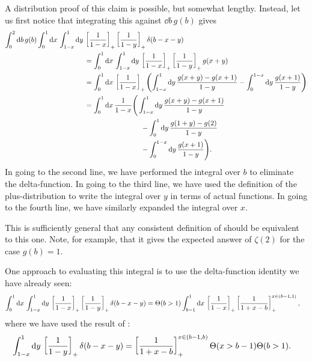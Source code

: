 A distribution proof of this claim is possible, but somewhat lengthy.
%
Instead, let us first notice that integrating this against \(\dd b\,g(b)\) gives
\begin{align}
    \int_0^2 \dd b\,g(b)
    \int_{0}^{1} \dd x\,
    \int_{1-x}^{1} \dd y\,
    &
    \le[\frac{1}{1-x}\ri]_+
    \le[\frac{1}{1-y}\ri]_+
    \delta(b - x - y)
    \notag
    \\
    &=
    \notag
    \int_{0}^{1} \dd x\,
    \int_{1-x}^{1} \dd y\,
    \le[\frac{1}{1-x}\ri]_+
    \le[\frac{1}{1-y}\ri]_+
    g(x + y)
    \\
    &=
    \notag
    \int_{0}^{1} \dd x\,
    \le[\frac{1}{1-x}\ri]_+
    \le(
        \int_{1-x}^{1} \dd y\,
        \frac{g(x + y) - g(x + 1)}{1-y}
        -
        \int_0^{1-x} \dd y\,
        \frac{g(x + 1)}{1-y}
    \ri)
    \\
    &=
    \int_{0}^{1} \dd x\,
    \frac{1}{1-x}
    \Bigg(
        \int_{1-x}^{1} \dd y\,
        \frac{g(x + y) - g(x + 1)}{1-y}
    \notag
        \\
        &\qquad\qquad\qquad\qquad
        -
        \int_{0}^{1} \dd y\,
        \frac{g(1 + y) - g(2)}{1-y}
    \label{eq:two-plus_one-delta_distribution}
        \\
    \notag
        &\qquad\qquad\qquad\qquad
        -
        \int_0^{1-x} \dd y\,
        \frac{g(x + 1)}{1-y}
    \Bigg)
    .
\end{align}
%
In going to the second line, we have performed the integral over \(b\) to eliminate the delta-function.
%
In going to the third line, we have used the definition of the plus-distribution to write the integral over \(y\) in terms of actual functions.
%
In going to the fourth line, we have similarly expanded the integral over \(x\).

This is sufficiently general that any consistent definition of  should be equivalent to this one.
%
Note, for example, that it gives the expected answer of \(\zeta(2)\) for the case \(g(b) = 1\).


One approach to evaluating this integral is to use the delta-function identity we have already seen:
\begin{align}
    \int_{0}^{1} \dd x\,
    \int_{1-x}^{1} \dd y\,
    \left[\frac{1}{1-x}\right]_+
    \left[\frac{1}{1-y}\right]_+
    \delta(b - x - y)
    &=
    \Theta(b > 1)
    \int_{b-1}^{1} \dd x\,
    \left[\frac{1}{1 - x}\right]_+
    \left[\frac{1}{1 + x - b}\right]_+^{x\in(b-1,1)}
    ,
\end{align}
where we have used the result of :
\begin{align}
    \int_{1-x}^{1} \dd y\,
    \left[\frac{1}{1-y}\right]_+
    \delta(b - x - y)
    &=
    \left[\frac{1}{1 + x - b}\right]_+^{x\in(b-1,b)}
    \Theta(x > b - 1)\Theta(b > 1)
    .
\end{align}

